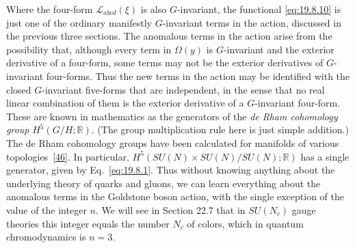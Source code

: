 Where the four-form $\mathcal L_{abcd}(\xi)$ is also $G$-invariant, the functional \eqref{eq:19.8.10} is just one of the ordinary manifestly $G$-invariant terms in the action, discussed in the previous three sections. The anomalous terms in the action arise from the possibility that, although every term in $\Omega(y)$ is $G$-invariant and the exterior derivative of a four-form, some terms may not be the exterior derivatives of $G$-invariant four-forms. Thus the new terms in the action may be identified with the closed $G$-invariant five-forms that are independent, in the sense that no real linear combination of them is the exterior derivative of a $G$-invariant four-form. These are known in mathematics as the generators of the \emph{de Rham cohomology group} $H^5(G/H;\mathbb R)$. (The group multiplication rule here is just simple addition.) The de Rham cohomology groups have been calculated for manifolds of various topologies~\hyperref[ch19-ref-46]{[46]}. In particular, $H^5(SU(N)\times SU(N)/SU(N);\mathbb R)$ has a single generator, given by Eq.~\eqref{eq:19.8.1}. Thus without knowing anything about the underlying theory of quarks and gluons, we can learn everything about the anomalous terms in the Goldstone boson action, with the single exception of the value of the integer $n$. We will see in Section 22.7 that in $SU(N_c)$ gauge theories this integer equals the number $N_c$ of colors, which in quantum chromodynamics is $n=3$.
